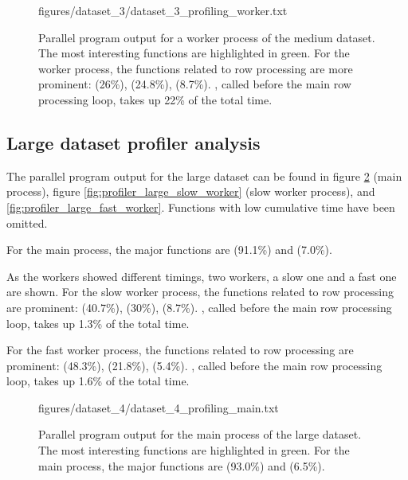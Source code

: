 \begin{figure}[ht]
  \begin{VerbatimInput}{figures/dataset_3/dataset_3_profiling_worker.txt}
    \caption[Parallel program  output for a worker process of the medium dataset.]{Parallel program  output for a worker process of the medium dataset.
    The most interesting functions are highlighted in green.
For the worker process, the functions related to row processing are more prominent:  (26\%),  (24.8\%), 
(8.7\%). , called before the main row processing loop, takes up 22\% of the total time.}
  \label{fig:profiler_medium_worker}
\end{VerbatimInput}
\end{figure}

\subsection{Large dataset profiler analysis}
The parallel program  output for the large dataset can be found in figure \ref{fig:profiler_large_main} (main process), figure 
\ref{fig:profiler_large_slow_worker} (slow worker process), and \ref{fig:profiler_large_fast_worker}. Functions with low cumulative time have been omitted.

For the main process, the major functions are  (91.1\%) and  (7.0\%).

As the workers showed different timings, two workers, a slow one and a fast one are shown.
For the slow worker process, the functions related to row processing are prominent:  (40.7\%),  (30\%), 
(8.7\%). , called before the main row processing loop, takes up 1.3\% of the total time.

For the fast worker process, the functions related to row processing are prominent:  (48.3\%),  (21.8\%), 
(5.4\%). , called before the main row processing loop, takes up 1.6\% of the total time.

\begin{figure}[ht]
  \begin{VerbatimInput}{figures/dataset_4/dataset_4_profiling_main.txt}
    \caption[Parallel program  output for the main process of the large dataset.]{Parallel program  output for the main process of the large dataset.
    The most interesting functions are highlighted in green.
For the main process, the major functions are  (93.0\%) and  (6.5\%).}
  \label{fig:profiler_large_main}
\end{VerbatimInput}
\end{figure}

